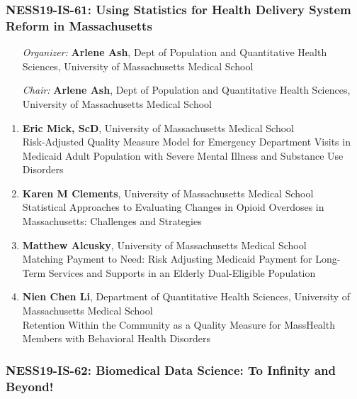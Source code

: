 \subsubsection*{NESS19-IS-61: Using Statistics for Health Delivery System Reform in Massachusetts}

\begin{enumerate}[align=left]
\item [\emph{Organizer:}] \textbf{Arlene Ash}, Dept of Population and Quantitative Health Sciences, University of Massachusetts Medical School
\item [\emph{Chair:}] \textbf{Arlene Ash}, Dept of Population and Quantitative Health Sciences, University of Massachusetts Medical School
\end{enumerate}

\begin{enumerate}
\item \textbf{Eric Mick, ScD}, University of Massachusetts Medical School \\
Risk-Adjusted Quality Measure Model for Emergency Department Visits in Medicaid Adult Population with Severe Mental Illness and Substance Use Disorders
\item \textbf{Karen M Clements}, University of Massachusetts Medical School \\
Statistical Approaches to Evaluating Changes in Opioid Overdoses in Massachusetts: Challenges and Strategies
\item \textbf{Matthew Alcusky}, University of Massachusetts Medical School \\
Matching Payment to Need: Risk Adjusting Medicaid Payment for Long-Term Services and Supports in an Elderly Dual-Eligible Population
\item \textbf{Nien Chen Li}, Department of Quantitative Health Sciences, University of Massachusetts Medical School \\
Retention Within the Community as a Quality Measure for MassHealth Members with Behavioral Health Disorders
\end{enumerate}

\subsubsection*{NESS19-IS-62: Biomedical Data Science: To Infinity and Beyond!}

